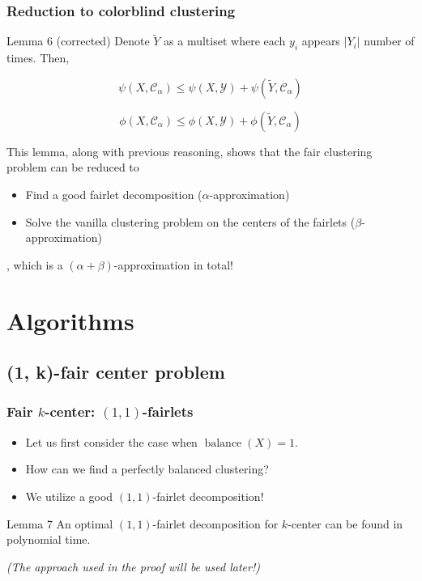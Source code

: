 \documentclass{beamer}
\DeclareMathOperator{\balance}{balance}
\begin{document}


\begin{frame}
\frametitle{Reduction to colorblind clustering}

\begin{block}{Lemma 6 (corrected)}
Denote $\tilde{Y}$ as a multiset where each $y_i$ appears $|Y_i|$ number of times. Then,

$$\psi(X, \mathcal{C}_\alpha) \leq \psi(X, \mathcal{Y}) + \psi(\tilde{Y}, \mathcal{C}_\alpha)$$

$$\phi(X, \mathcal{C}_\alpha) \leq \phi(X, \mathcal{Y}) + \phi(\tilde{Y}, \mathcal{C}_\alpha)$$

\end{block} \pause

This lemma, along with previous reasoning, shows that the fair clustering problem can be reduced to
\begin{itemize}
	\item Find a good fairlet decomposition ($\alpha$-approximation)
	\item Solve the vanilla clustering problem on the centers of the fairlets ($\beta$-approximation)
\end{itemize}
, which is a $(\alpha + \beta)$-approximation in total!

\end{frame}


\section{Algorithms}


\subsection{(1, k)-fair center problem}

\begin{frame}
\frametitle{Fair $k$-center: $(1, 1)$-fairlets}

\begin{itemize}
	\item Let us first consider the case when $\balance(X) = 1$. \pause
	
	\item How can we find a perfectly balanced clustering? \pause
	
	\item We utilize a good $(1, 1)$-fairlet decomposition! \pause
\end{itemize}

\begin{block}{Lemma 7}
An optimal $(1, 1)$-fairlet decomposition for $k$-center can be found in polynomial time.

\end{block}
{\it (The approach used in the proof will be used later!)}

\end{frame}
\end{document}
